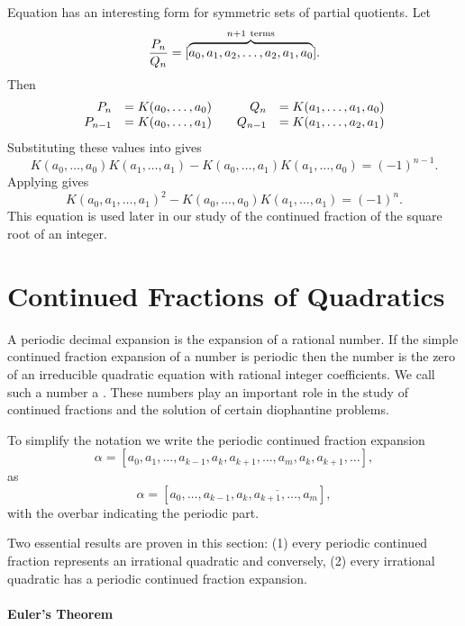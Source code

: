 Equation  has an interesting form for
symmetric sets of partial quotients.  Let
\[
\frac{P_n}{Q_n} = [\overbrace{\vphantom{b}a _0, a_1, a_2, \ldots, a_2, a_1,
a_0}^{n+1\ {\rm terms}}].
\]
Then
\[
\begin{array}{rl@{\qquad}rl}
P_n & = K(a_0, \ldots, a_0) & Q_n & = K(a_1, \ldots, a_1, a_0) \\
P_{n-1} & = K(a_0, \ldots, a_1) & Q_{n-1} & = K(a_1, \ldots, a_2, a_1)
\end{array}
\]
Substituting these values into  gives
\[
K(a_0, \ldots, a_0) K(a_1, \ldots, a_1) 
  - K(a_0, \ldots, a_1) K(a_1, \ldots, a_0) = (-1)^{n-1}.
\]
Applying  gives
\begin{equation} \label{CF:Continuant:Unit:Eq}
K(a_0, a_1, \ldots, a_1)^2 - K(a_0, \ldots, a_0) K(a_1, \ldots, a_1)
= (-1)^n.
\end{equation}
This equation is used later in our study of the continued fraction of
the square root of an integer.


\section{Continued Fractions of Quadratics}
\label{CF:Quadratics:Sec}

A periodic decimal expansion is the expansion of a rational number.
If the simple continued fraction expansion of a number is periodic
then the number is the zero of an irreducible quadratic equation with
rational integer coefficients. We
call such a number a .  These numbers play
an important role in the study of continued fractions and the solution
of certain diophantine problems.

To simplify the notation we write the periodic continued fraction
expansion
\[
\alpha = [a_0, a_1, \ldots, a_{k-1}, a_{k}, a_{k+1}, \ldots, a_m, a_k,
a_{k+1}, \ldots],
\]
as
\[
\alpha = [a_0, \ldots, a_{k-1}, \overline{a_k, a_{k+1}, \ldots, a_m}],
\]
with the overbar indicating the periodic part.

Two essential results are proven in this section: (1) every periodic
continued fraction represents an irrational quadratic and conversely,
(2) every irrational quadratic has a periodic continued fraction
expansion.

\paragraph{Euler's Theorem}

